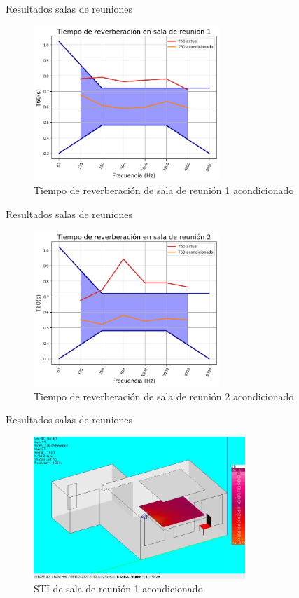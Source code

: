 \documentclass{sintefbeamer}
\begin{document}
\begin{frame}{Resultados salas de reuniones}
    \begin{figure}
        \centering
        \includegraphics[width=7cm]{images/DIN/DIN sala reunion 1 comparacion.png}
        \caption{Tiempo de reverberación de sala de reunión 1 acondicionado}
        \label{fig:din sala 1 acond}
    \end{figure}
\end{frame}
\begin{frame}{Resultados salas de reuniones}
    \begin{figure}
        \centering
        \includegraphics[width=7cm]{images/DIN/DIN sala reunion 2 comparacion.png}
        \caption{Tiempo de reverberación de sala de reunión 2 acondicionado}
        \label{fig:din sala 2 acond}
    \end{figure}
\end{frame}

\begin{frame}{Resultados salas de reuniones}
    \begin{figure}
        \centering
        \includegraphics[width=8cm]{images/STI acondicionado/STI_Reunion1_ConAcond.jpg}
        \caption{STI de sala de reunión 1 acondicionado}
        \label{fig:STI sala 1 acond}
    \end{figure}
\end{frame}
\end{document}
